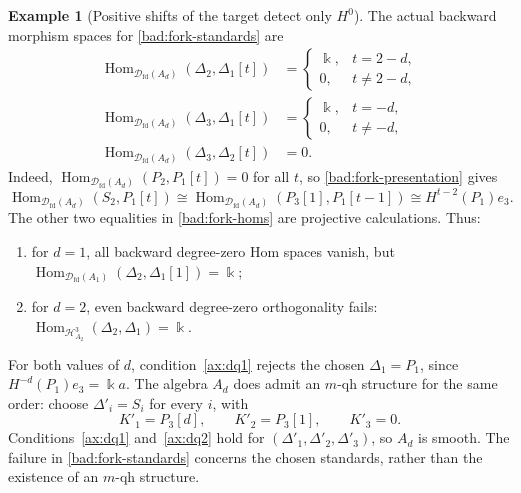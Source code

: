 \documentclass[11pt,a4paper]{article}
\newcommand{\D}{\mathcal D}
\renewcommand{\H}{\mathcal H}
\newcommand{\std}{\Delta}
\DeclareMathOperator{\fd}{fd}
\DeclareMathOperator{\Hom}{Hom}
\theoremstyle{plain}
\theoremstyle{definition}
\newtheorem{example}[theorem]{Example}
\numberwithin{equation}{section}
\begin{document}
\begin{example}[Positive shifts of the target detect only $H^0$]
The actual backward morphism spaces for
\eqref{bad:fork-standards} are
\begin{equation}\label{bad:fork-homs}
 \begin{aligned}
 \Hom_{\D_{\fd}(A_d)}(\std_2,\std_1[t])
 &=\begin{cases}\Bbbk,&t=2-d,\\0,&t\neq2-d,\end{cases}\\
 \Hom_{\D_{\fd}(A_d)}(\std_3,\std_1[t])
 &=\begin{cases}\Bbbk,&t=-d,\\0,&t\neq-d,\end{cases}\\
 \Hom_{\D_{\fd}(A_d)}(\std_3,\std_2[t])&=0.
 \end{aligned}
\end{equation}
Indeed, $\Hom_{\D_{\fd}(A_d)}(P_2,P_1[t])=0$ for all $t$, so
\eqref{bad:fork-presentation} gives
\[
 \Hom_{\D_{\fd}(A_d)}(S_2,P_1[t])
 \cong\Hom_{\D_{\fd}(A_d)}(P_3[1],P_1[t-1])
 \cong H^{t-2}(P_1)e_3.
\]
The other two equalities in \eqref{bad:fork-homs} are projective
calculations. Thus:
\begin{enumerate}[label=\textup{(\roman*)}]
 \item for $d=1$, all backward degree-zero Hom spaces vanish,
 but $\Hom_{\D_{\fd}(A_1)}(\std_2,\std_1[1])=\Bbbk$;
 \item for $d=2$, even backward degree-zero orthogonality fails:
 $\Hom_{\H_{A_2}^3}(\std_2,\std_1)=\Bbbk$.
\end{enumerate}
For both values of $d$, condition~\ref{ax:dq1} rejects the chosen
$\std_1=P_1$, since $H^{-d}(P_1)e_3=\Bbbk a$.
The algebra $A_d$ does admit an $m$-qh structure for the same order:
choose $\std'_i=S_i$ for every $i$, with
\[
 K'_1=P_3[d],\qquad K'_2=P_3[1],\qquad K'_3=0.
\]
Conditions~\ref{ax:dq1} and~\ref{ax:dq2} hold for
$(\std'_1,\std'_2,\std'_3)$, so $A_d$ is smooth. The failure in
\eqref{bad:fork-standards} concerns the chosen standards, rather
than the existence of an $m$-qh structure.
\end{example}
\end{document}
